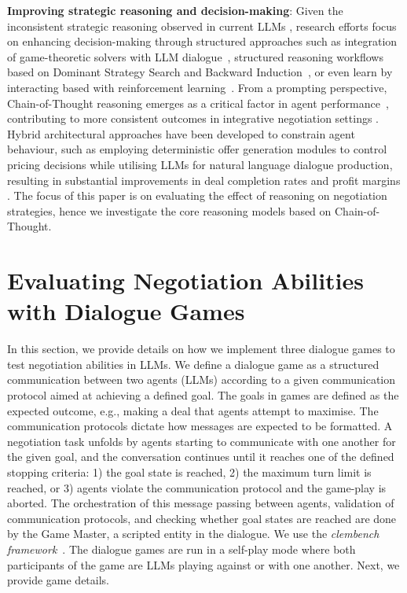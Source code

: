 \documentclass[11pt]{article}
\begin{document}
\textbf{Improving strategic reasoning and decision-making}: Given the inconsistent strategic reasoning observed in current LLMs \cite{wong2025reasoningcapabilitieslargelanguage}, research efforts focus on enhancing decision-making through structured approaches such as integration of game-theoretic solvers with LLM dialogue~\cite{DBLP:journals/corr/abs-2402-01704}, structured reasoning workflows based on Dominant Strategy Search and Backward Induction~\cite{DBLP:journals/corr/abs-2411-05990}, or even learn by interacting based with reinforcement learning~\cite{DBLP:conf/iclr/CaoLLLTC18}. From a prompting perspective, Chain-of-Thought reasoning emerges as a critical factor in agent performance~\cite{DBLP:journals/corr/abs-2305-19165}, contributing to more consistent outcomes in integrative negotiation settings \cite{DBLP:journals/corr/abs-2503-06416}. Hybrid architectural approaches have been developed to constrain agent behaviour, such as employing deterministic offer generation modules to control pricing decisions while utilising LLMs for natural language dialogue production, resulting in substantial improvements in deal completion rates and profit margins \cite{DBLP:conf/acl/Xia0RMZ0024}. The focus of this paper is on evaluating the effect of reasoning on negotiation strategies, hence  we investigate the core reasoning models based on Chain-of-Thought.

\section{Evaluating Negotiation Abilities with Dialogue Games}

In this section, we provide details on how we implement three dialogue games to test negotiation abilities in LLMs. We define a dialogue game as a structured communication between two agents (LLMs) according to a given communication protocol aimed at achieving a defined goal. The goals in games are defined as the expected outcome, e.g., making a deal that agents attempt to maximise. The communication protocols dictate how messages are expected to be formatted. A negotiation task unfolds by agents starting to communicate with one another for the given goal, and the conversation continues until it reaches one of the defined stopping criteria: 1) the goal state is reached, 2) the maximum turn limit is reached, or 3) agents violate the communication protocol and the game-play is aborted. The orchestration of this message passing between agents, validation of communication protocols, and checking whether goal states are reached are done by the Game Master, a scripted entity in the dialogue. We use the \textit{clembench framework}~\cite{chalamalasetti-etal-2023-clembench}. The dialogue games are run in a self-play mode where both participants of the game are LLMs playing against or with one another. Next, we provide game details.
\end{document}
